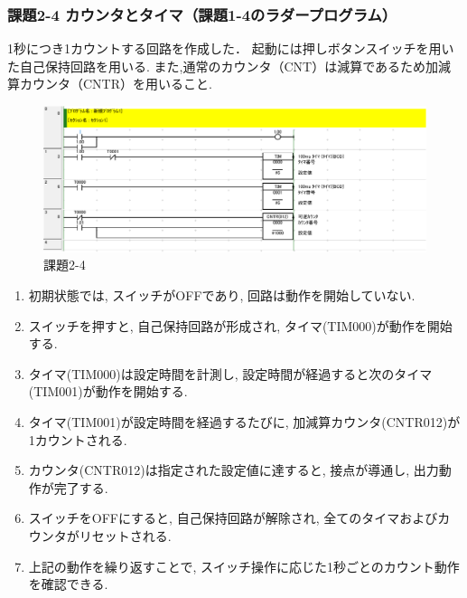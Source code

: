 \subsubsection*{課題2-4 カウンタとタイマ（課題1-4のラダープログラム）}
1秒につき1カウントする回路を作成した．
起動には押しボタンスイッチを用いた自己保持回路を用いる.
また,通常のカウンタ（CNT）は減算であるため加減算カウンタ（CNTR）を用いること.
\begin{figure}[H]
  \centering
  \includegraphics[scale=1]{sozai/2-4-crop.pdf}
  \caption{課題2-4}
\end{figure}
\begin{enumerate}
  \item 初期状態では, スイッチがOFFであり, 回路は動作を開始していない.
  \item スイッチを押すと, 自己保持回路が形成され, タイマ(TIM000)が動作を開始する.
  \item タイマ(TIM000)は設定時間を計測し, 設定時間が経過すると次のタイマ(TIM001)が動作を開始する.
  \item タイマ(TIM001)が設定時間を経過するたびに, 加減算カウンタ(CNTR012)が1カウントされる.
  \item カウンタ(CNTR012)は指定された設定値に達すると, 接点が導通し, 出力動作が完了する.
  \item スイッチをOFFにすると, 自己保持回路が解除され, 全てのタイマおよびカウンタがリセットされる.
  \item 上記の動作を繰り返すことで, スイッチ操作に応じた1秒ごとのカウント動作を確認できる.
\end{enumerate}



